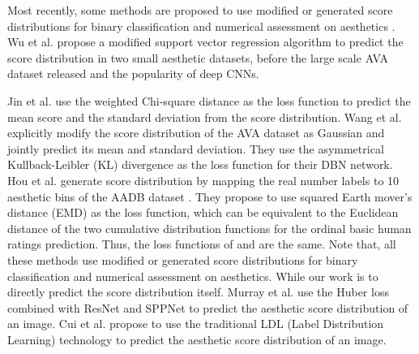 \documentclass[letterpaper]{article} %
\begin{document}
Most recently, some methods are proposed to use modified or generated score distributions for binary classification and numerical assessment on aesthetics \cite{JinICIP2016,WangIJCNN2017,HouArXiv2016}. Wu et al. \cite{WuICCV2011} propose a modified support vector regression algorithm to predict the score distribution in two small aesthetic datasets, before the large scale AVA dataset released and the popularity of deep CNNs. 

Jin et al. \cite{JinICIP2016} use the weighted Chi-square distance as the loss function to predict the mean score and the standard deviation from the score distribution. Wang et al. \cite{WangIJCNN2017} explicitly modify the score distribution of the AVA dataset as Gaussian and jointly predict its mean and standard deviation. They use the asymmetrical  Kullback-Leibler (KL) divergence as the loss function for their DBN network. Hou et al. \cite{HouArXiv2016} generate score distribution by mapping the real number labels to 10 aesthetic bins of the AADB dataset \cite{KongECCV2016}. They propose to use squared Earth mover's distance (EMD) as the loss function, which can be equivalent to the Euclidean distance of the two cumulative distribution functions for the ordinal basic human ratings prediction. Thus, the loss functions of \cite{HouArXiv2016} and \cite{WuICCV2011} are the same. Note that, all these methods use modified or generated score distributions for binary classification and numerical assessment on aesthetics. While our work is to directly predict the score distribution itself. Murray et al. \cite{MurrayArXiv2017} use the Huber loss combined with ResNet and SPPNet to predict the aesthetic score distribution of an image. Cui et al. \cite{CuiSigIR2017} propose to use the traditional LDL (Label Distribution Learning) technology to predict the aesthetic score distribution of an image. 
\end{document}
